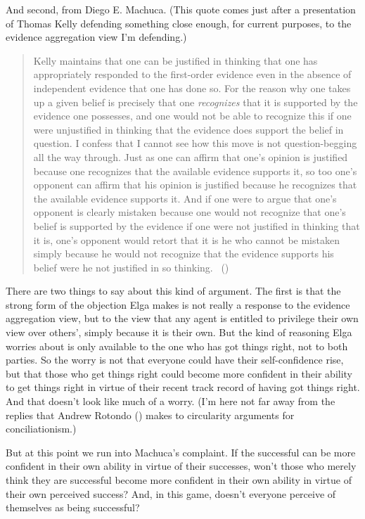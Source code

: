 \documentclass[
  10pt,
  letterpaper,
  twoside]{scrbook}
\begin{document}
And second, from Diego E. Machuca. (This quote comes just after a
presentation of Thomas Kelly defending something close enough, for
current purposes, to the evidence aggregation view I'm defending.)

\begin{quote}
Kelly maintains that one can be justified in thinking that one has
appropriately responded to the first-order evidence even in the absence
of independent evidence that one has done so. For the reason why one
takes up a given belief is precisely that one \emph{recognizes} that it
is supported by the evidence one possesses, and one would not be able to
recognize this if one were unjustified in thinking that the evidence
does support the belief in question. I confess that I cannot see how
this move is not question-begging all the way through. Just as one can
affirm that one's opinion is justified because one recognizes that the
available evidence supports it, so too one's opponent can affirm that
his opinion is justified because he recognizes that the available
evidence supports it. And if one were to argue that one's opponent is
clearly mistaken because one would not recognize that one's belief is
supported by the evidence if one were not justified in thinking that it
is, one's opponent would retort that it is he who cannot be mistaken
simply because he would not recognize that the evidence supports his
belief were he not justified in so thinking.
~()
\end{quote}

There are two things to say about this kind of argument. The first is
that the strong form of the objection Elga makes is not really a
response to the evidence aggregation view, but to the view that any
agent is entitled to privilege their own view over others', simply
because it is their own. But the kind of reasoning Elga worries about is
only available to the one who has got things right, not to both parties.
So the worry is not that everyone could have their self-confidence rise,
but that those who get things right could become more confident in their
ability to get things right in virtue of their recent track record of
having got things right. And that doesn't look like much of a worry.
(I'm here not far away from the replies that Andrew Rotondo
() makes to circularity arguments for
conciliationism.)

But at this point we run into Machuca's complaint. If the successful can
be more confident in their own ability in virtue of their successes,
won't those who merely think they are successful become more confident
in their own ability in virtue of their own perceived success? And, in
this game, doesn't everyone perceive of themselves as being successful?
\end{document}
